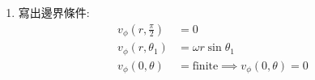 \documentclass[../main.tex]{subfiles}
\begin{document}
\begin{itemize}
\begin{enumerate}
    解出:
    \begin{align}
      -\rho \frac{v_\phi^2}{r} &= -\frac{\partial p}{\partial r} - \rho g \cos\theta \nonumber\\
      -\rho \frac{(\omega R v_\phi^\ast)^2}{R r^\ast} &= -\frac{\mu \omega}{R}\frac{\partial p^\ast}{\partial r^\ast} - \rho g \cos\theta \nonumber\\
      (\text{同除}\frac{\mu \omega}{R})\Rightarrow\quad
      -\frac{\rho \omega R^2}{\mu}\frac{( v_\phi^\ast)^2}{ r^\ast} &= -\frac{\partial p^\ast}{\partial r^\ast} - \frac{\rho g R}{\mu \omega} \cos\theta \nonumber\\
      -\text{Re}\frac{( v_\phi^\ast)^2}{ r^\ast} &= -\frac{\partial p^\ast}{\partial r^\ast} - \frac{\rho g R}{\mu \omega} \cos\theta \nonumber\\
      \Rightarrow\quad
      \frac{\partial p^\ast}{\partial r^\ast} &= - \frac{\rho g R}{\mu \omega} \cos\theta + \text{Re}\frac{( v_\phi^\ast)^2}{ r^\ast}
    \end{align}
    而因為Re很小，所以可以忽略右邊
    \begin{equation}
      \frac{\partial p^\ast}{\partial r^\ast} = - \frac{\rho g R}{\mu \omega} \cos\theta
    \end{equation}
    再換回原本的變數:
    \begin{equation}
      \frac{\partial p}{\partial r} = - \rho g \cos\theta \implies \frac{\partial \mathbb{P}}{\partial r} = 0
    \end{equation}
    同理，$\theta$方向也可以得到:
    \begin{equation}
      \frac{1}{r}\frac{\partial p}{\partial \theta} =  \rho g \sin\theta
    \end{equation}
    而因為這個步驟很煩人，所以只要說是Creeping Flow\\
    黏滯力主導，就可以等價的把左邊的:
    \begin{equation}
      -\frac{\rho v_\phi^2 \cot\theta}{r} \approx 0,\quad -\rho \frac{v_\phi^2}{r} \approx 0
    \end{equation}
    \item 寫出邊界條件:
    \begin{align}
      v_\phi(r,\frac{\pi}{2}) &= 0 \label{eq:ch2_3_cone_plate_bc1}\\
      v_\phi(r,\theta_1) &= \omega r \sin\theta_1 \label{eq:ch2_3_cone_plate_bc2}\\
      v_\phi(0,\theta) &= \text{finite} \implies  v_\phi(0,\theta) = 0 \label{eq:ch2_3_cone_plate_bc3}\\

\end{align}
\end{enumerate}
\end{itemize}
\end{document}
